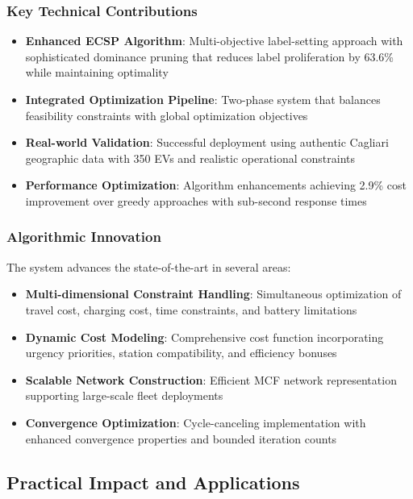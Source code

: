 \documentclass[12pt,a4paper]{article}
\begin{document}
\subsubsection{Key Technical Contributions}

\begin{itemize}
    \item \textbf{Enhanced ECSP Algorithm}: Multi-objective label-setting approach with sophisticated dominance pruning that reduces label proliferation by 63.6\% while maintaining optimality
    \item \textbf{Integrated Optimization Pipeline}: Two-phase system that balances feasibility constraints with global optimization objectives
    \item \textbf{Real-world Validation}: Successful deployment using authentic Cagliari geographic data with 350 EVs and realistic operational constraints
    \item \textbf{Performance Optimization}: Algorithm enhancements achieving 2.9\% cost improvement over greedy approaches with sub-second response times
\end{itemize}

\subsubsection{Algorithmic Innovation}

The system advances the state-of-the-art in several areas:

\begin{itemize}
    \item \textbf{Multi-dimensional Constraint Handling}: Simultaneous optimization of travel cost, charging cost, time constraints, and battery limitations
    \item \textbf{Dynamic Cost Modeling}: Comprehensive cost function incorporating urgency priorities, station compatibility, and efficiency bonuses
    \item \textbf{Scalable Network Construction}: Efficient MCF network representation supporting large-scale fleet deployments
    \item \textbf{Convergence Optimization}: Cycle-canceling implementation with enhanced convergence properties and bounded iteration counts
\end{itemize}

\subsection{Practical Impact and Applications}
\end{document}
